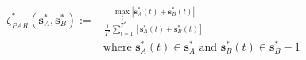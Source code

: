 \begin{equation}
\begin{split}
	\zeta^*_{PAR}(\textbf{s}^*_{A}, \textbf{s}^*_{B}) :=& \frac{\max_t \left| \textbf{s}^*_{A}(t)+\textbf{s}^*_{B}(t)\right|}{\frac{1}{T^*}\sum_{t=1}^{T^*}\left[\textbf{s}^*_{A}(t)+\textbf{s}^*_{B}(t)\right]}\\
	& \text{where } \textbf{s}^*_{A}(t) \in \textbf{s}^*_{A} \text{ and } \textbf{s}^*_{B}(t) \in \textbf{s}^*_{B} - 1
\end{split}
\label{ch1:equ:peak-to-average-definition}
\end{equation}
